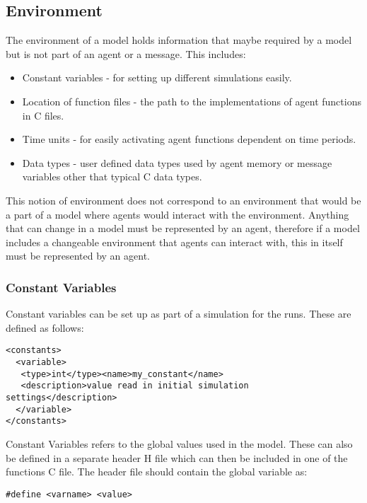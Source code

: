 \subsection{Environment}

The environment of a model holds information that maybe required by a model but
is not part of an agent or a message. This includes:

\begin{itemize}
\item Constant variables - for setting up different simulations easily.
\item Location of function files - the path to the implementations of agent
functions in C files.
\item Time units - for easily activating agent functions dependent on time
periods.
\item Data types - user defined data types used by agent memory or
message variables other that typical C data types.
\end{itemize}

This notion of environment does not correspond to an environment that would be
a part of a model where agents would interact with the environment. Anything
that can change in a model must be represented by an agent, therefore if a
model includes a changeable environment that agents can interact with, this in
itself must be represented by an agent.

\subsubsection{Constant Variables}

Constant variables can be set up as part of a simulation for the runs. These are defined as follows:

\begin{mylisting}
\begin{verbatim}
<constants>
  <variable>
   <type>int</type><name>my_constant</name>
   <description>value read in initial simulation settings</description>
  </variable>
</constants>
\end{verbatim}
\end{mylisting}


Constant Variables refers to the global values used in the model. These can also be
defined in a separate header H file which can then be included in one of the
functions C file.
The header file should contain the global variable as:

 \begin{mylisting}
 \begin{verbatim}
#define <varname> <value>
 \end{verbatim}
 \end{mylisting}

